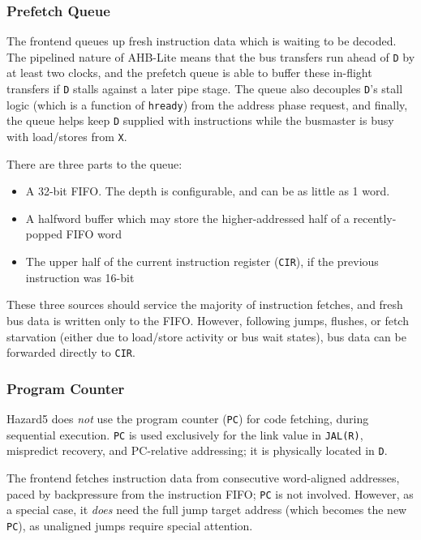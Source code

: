 \documentclass[notitlepage]{article}
\begin{document}
\subsubsection{Prefetch Queue}

The frontend queues up fresh instruction data which is waiting to be decoded. The pipelined nature of AHB-Lite means that the bus transfers run ahead of \texttt{D} by at least two clocks, and the prefetch queue is able to buffer these in-flight transfers if \texttt{D} stalls against a later pipe stage. The queue also decouples \texttt{D}'s stall logic (which is a function of \texttt{hready}) from the address phase request, and finally, the queue helps keep \texttt{D} supplied with instructions while the busmaster is busy with load/stores from \texttt{X}.

There are three parts to the queue:

\begin{itemize}
	\item A 32-bit FIFO. The depth is configurable, and can be as little as 1 word.
	\item A halfword buffer which may store the higher-addressed half of a recently-popped FIFO word
	\item The upper half of the current instruction register (\texttt{CIR}), if the previous instruction was 16-bit
\end{itemize}

These three sources should service the majority of instruction fetches, and fresh bus data is written only to the FIFO. However, following jumps, flushes, or fetch starvation (either due to load/store activity or bus wait states), bus data can be forwarded directly to \texttt{CIR}.

\subsubsection{Program Counter}

Hazard5 does \textit{not} use the program counter (\texttt{PC}) for code fetching, during sequential execution. \texttt{PC} is used exclusively for the link value in \texttt{JAL(R)}, mispredict recovery, and PC-relative addressing; it is physically located in \texttt{D}.

The frontend fetches instruction data from consecutive word-aligned addresses, paced by backpressure from the instruction FIFO; \texttt{PC} is not involved. However, as a special case, it \textit{does} need the full jump target address (which becomes the new \texttt{PC}), as unaligned jumps require special attention.
\end{document}
